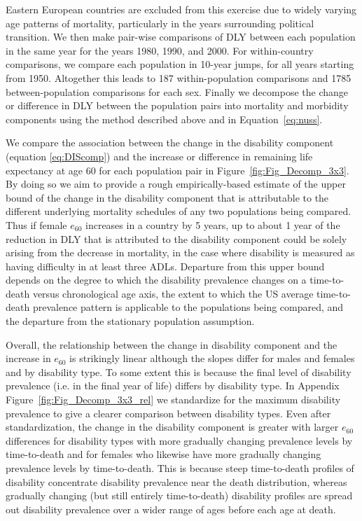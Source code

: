 \documentclass[11pt,oneside,a4paper]{article} %
\begin{document}
Eastern European countries are excluded from this exercise due to widely varying
age patterns of mortality, particularly in the years surrounding political
transition. We then make pair-wise comparisons of DLY between each population in
the same year for the years 1980, 1990, and 2000.
For within-country comparisons, we compare each population in
10-year jumps, for all years starting from 1950. Altogether this leads to
187 within-population comparisons and 1785 between-population comparisons for
each sex. Finally we decompose the change or difference in DLY between the
population pairs into mortality and morbidity components using the
\citet{Nusselder2004} method described above and in Equation~\eqref{eq:nuss}.

We compare the association between the change in the disability component
(equation \ref{eq:DIScomp}) and the increase or difference in remaining life
expectancy at age 60 for each population pair in
Figure~\ref{fig:Fig_Decomp_3x3}. By doing so we aim to provide a rough
empirically-based estimate of the upper bound of the change in the disability
component that is attributable to the different underlying mortality schedules
of any two populations being compared. Thus if female $e_{60}$ increases in a
country by 5 years, up to about 1 year of the reduction in DLY that is
attributed to the disability component could be solely arising from the decrease
in mortality, in the case where disability is measured as having difficulty in
at least three ADLs. Departure from this upper bound depends on the degree to
which the disability prevalence changes on a time-to-death versus chronological
age axis, the extent to which the US average time-to-death prevalence pattern is
applicable to the populations being compared, and the departure from the stationary population assumption.

Overall, the relationship between the change in disability component and the
increase in $e_{60}$ is strikingly linear although the slopes differ for males
and females and by disability type. To some extent this is because the
final level of disability prevalence (i.e. in the final year of life) differs by
disability type.
In Appendix Figure~\ref{fig:Fig_Decomp_3x3_rel} we standardize for the maximum
disability prevalence to give a clearer comparison between disability types.
Even after standardization, the change in the disability component is
greater with larger $e_{60}$ differences for disability types with more
gradually changing prevalence levels by time-to-death and for females who
likewise have more gradually changing prevalence levels by time-to-death.
This is because steep time-to-death profiles of disability concentrate
disability prevalence near the death distribution,
whereas gradually changing (but still entirely time-to-death) disability
profiles are spread out disability prevalence over a wider range of ages before
each age at death.
\end{document}

